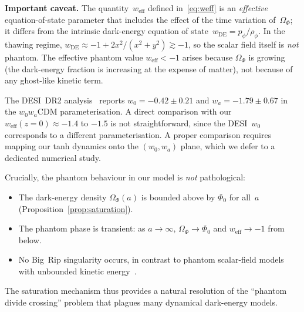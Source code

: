 \documentclass[12pt,a4paper]{article}
\theoremstyle{definition}
\theoremstyle{plain}
\theoremstyle{remark}
\begin{document}
\medskip\noindent
\textbf{Important caveat.}\;
The quantity~$w_{\mathrm{eff}}$ defined in~\eqref{eq:weff} is an
\emph{effective} equation-of-state parameter that includes the effect of
the time variation of~$\Omega_{\Phi}$; it differs from the intrinsic
dark-energy equation of state~$w_{\mathrm{DE}} = p_{\phi}/\rho_{\phi}$.
In the thawing regime, $w_{\mathrm{DE}} \approx -1 + 2x^{2}/(x^{2}+y^{2})
\gtrsim -1$, so the scalar field itself is \emph{not} phantom.
The effective phantom value $w_{\mathrm{eff}} < -1$ arises because
$\Omega_{\Phi}$ is growing (the dark-energy fraction is increasing
at the expense of matter), not because of any ghost-like kinetic term.

The DESI~DR2 analysis~\cite{DESI2025} reports
$w_{0} = -0.42 \pm 0.21$ and $w_{a} = -1.79 \pm 0.67$ in the
$w_{0}w_{a}$CDM parameterisation.  A direct comparison with our
$w_{\mathrm{eff}}(z=0) \approx -1.4$ to $-1.5$ is not straightforward, since
the DESI~$w_{0}$ corresponds to a different parameterisation.
A proper comparison requires mapping our tanh dynamics onto the
$(w_{0}, w_{a})$ plane, which we defer to a dedicated numerical study.

Crucially, the phantom behaviour
in our model is \emph{not} pathological:

\begin{itemize}
  \item The dark-energy density $\Omega_{\Phi}(a)$ is bounded above by
        $\Phi_{0}$ for all~$a$ (Proposition~\ref{prop:saturation}).
  \item The phantom phase is transient: as $a \to \infty$,
        $\Omega_{\Phi} \to \Phi_{0}$ and
        $w_{\mathrm{eff}} \to -1$ from below.
  \item No Big~Rip singularity occurs, in contrast to phantom
        scalar-field models with unbounded kinetic
        energy~\cite{Carroll2001}.
\end{itemize}
The saturation mechanism thus provides a natural resolution of the
``phantom divide crossing'' problem that plagues many dynamical
dark-energy models.
\end{document}
